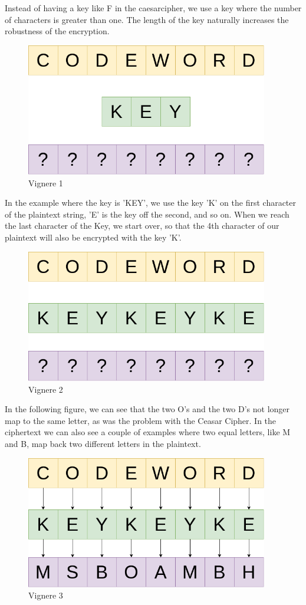 \documentclass{article}
\begin{document}
Instead of having a key like F in the caesarcipher, we use a key where the number of characters is greater than one. The length of the key naturally increases the robustness of the encryption. 

\begin{figure}[H]
 \centering
  \includegraphics[width=300pt]{img/vigneredraw1.png}
 \caption{Vignere 1}
 \end{figure}

In the example where the key is 'KEY', we use the key 'K' on the first character of the plaintext string, 'E' is the key off the second, and so on. When we reach the last character of the Key, we start over, so that the 4th character of our plaintext will also be encrypted with the key 'K'.

\begin{figure}[H]
 \centering
  \includegraphics[width=300pt]{img/vigneredraw2.png}
 \caption{Vignere 2}
 \end{figure}

In the following figure, we can see that the two O's and the two D's not longer map to the same letter, as was the problem with the Ceasar Cipher. In the ciphertext we can also see a couple of examples where two equal letters, like M and B, map back two different letters in the plaintext. 

\begin{figure}[H]
 \centering
  \includegraphics[width=300pt]{img/vigneredraw3.png}
 \caption{Vignere 3}
 \end{figure}
\end{document}
